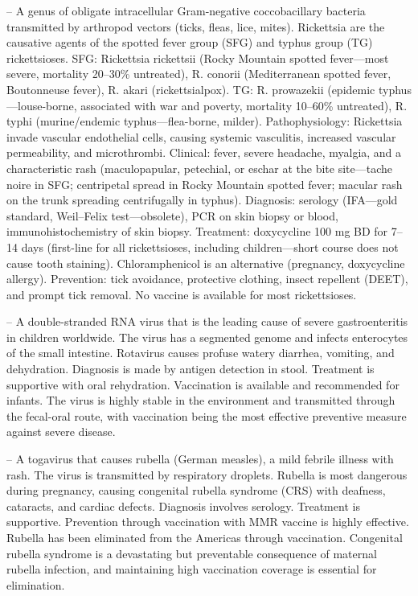 -- A genus of obligate intracellular Gram-negative coccobacillary bacteria transmitted by arthropod vectors (ticks, fleas, lice, mites). Rickettsia are the causative agents of the spotted fever group (SFG) and typhus group (TG) rickettsioses. SFG: Rickettsia rickettsii (Rocky Mountain spotted fever—most severe, mortality 20--30\% untreated), R. conorii (Mediterranean spotted fever, Boutonneuse fever), R. akari (rickettsialpox). TG: R. prowazekii (epidemic typhus—louse-borne, associated with war and poverty, mortality 10--60\% untreated), R. typhi (murine/endemic typhus—flea-borne, milder). Pathophysiology: Rickettsia invade vascular endothelial cells, causing systemic vasculitis, increased vascular permeability, and microthrombi. Clinical: fever, severe headache, myalgia, and a characteristic rash (maculopapular, petechial, or eschar at the bite site—tache noire in SFG; centripetal spread in Rocky Mountain spotted fever; macular rash on the trunk spreading centrifugally in typhus). Diagnosis: serology (IFA—gold standard, Weil–Felix test—obsolete), PCR on skin biopsy or blood, immunohistochemistry of skin biopsy. Treatment: doxycycline 100 mg BD for 7--14 days (first-line for all rickettsioses, including children—short course does not cause tooth staining). Chloramphenicol is an alternative (pregnancy, doxycycline allergy). Prevention: tick avoidance, protective clothing, insect repellent (DEET), and prompt tick removal. No vaccine is available for most rickettsioses.

-- A double-stranded RNA virus that is the leading cause of severe gastroenteritis in children worldwide. The virus has a segmented genome and infects enterocytes of the small intestine. Rotavirus causes profuse watery diarrhea, vomiting, and dehydration. Diagnosis is made by antigen detection in stool. Treatment is supportive with oral rehydration. Vaccination is available and recommended for infants. The virus is highly stable in the environment and transmitted through the fecal-oral route, with vaccination being the most effective preventive measure against severe disease.

-- A togavirus that causes rubella (German measles), a mild febrile illness with rash. The virus is transmitted by respiratory droplets. Rubella is most dangerous during pregnancy, causing congenital rubella syndrome (CRS) with deafness, cataracts, and cardiac defects. Diagnosis involves serology. Treatment is supportive. Prevention through vaccination with MMR vaccine is highly effective. Rubella has been eliminated from the Americas through vaccination. Congenital rubella syndrome is a devastating but preventable consequence of maternal rubella infection, and maintaining high vaccination coverage is essential for elimination.

